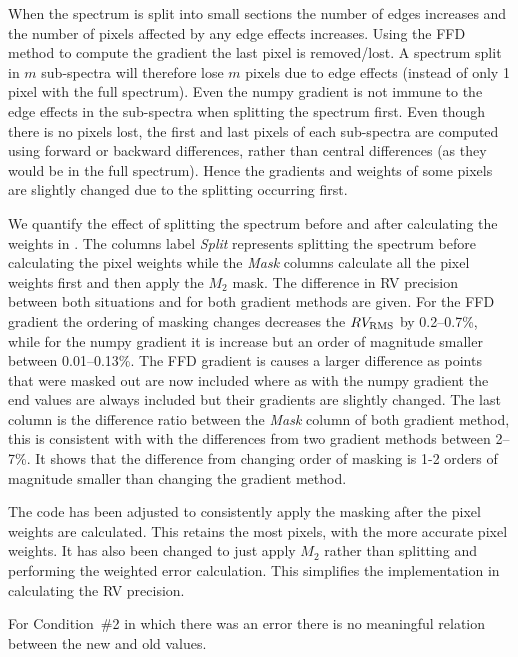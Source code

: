 When the spectrum is split into small sections the number of edges increases and the number of pixels affected by any edge effects increases. Using the {FFD} method to compute the gradient the last pixel is removed/lost. A spectrum split in \(m\) sub-spectra will therefore lose \(m\) pixels due to edge effects (instead of only 1 pixel with the full spectrum).
Even the numpy gradient is not immune to the edge effects in the sub-spectra when splitting the spectrum first. Even though there is no pixels lost, the first and last pixels of each sub-spectra are computed using forward or backward differences, rather than central differences (as they would be in the full spectrum). Hence the gradients and weights of some pixels are slightly changed due to the splitting occurring first.

We quantify the effect of splitting the spectrum before and after calculating the weights in . The columns label \emph{Split} represents splitting the spectrum before calculating the pixel weights while the \emph{Mask} columns calculate all the pixel weights first and then apply the \(M_2\) mask. The difference in {RV} precision between both situations and for both gradient methods are given.
For the {FFD} gradient the ordering of masking changes decreases the {\red{}\(RV_{\textrm{RMS}}\)} by 0.2--0.7\%, while for the numpy gradient it is increase but an order of magnitude smaller between 0.01--0.13\%.
The {FFD} gradient is causes a larger difference as points that were masked out are now included where as with the numpy gradient the end values are always included but their gradients are slightly changed.
The last column is the difference ratio between the \emph{Mask} column of both gradient method, this is consistent with  with the differences from two gradient methods between 2--7\%.
It shows that the difference from changing order of masking is 1-2 orders of magnitude smaller than changing the gradient method.

The code has been adjusted to consistently apply the masking after the pixel weights are calculated. This retains the most pixels, with the more accurate pixel weights. It has also been changed to just apply \(M_2\) rather than splitting and performing the weighted error calculation. This simplifies the implementation in calculating the {RV} precision.



{\red{} For Condition~\#2 in which there was an error there is no meaningful relation between the new and old values. }


